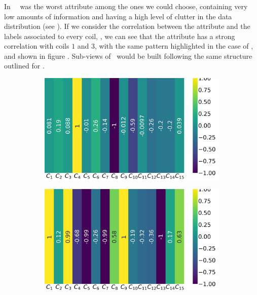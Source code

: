\subsubsection{\bn}
In \qrp\ \bn\ was the worst attribute among the ones we could choose, containing very low amounts of information and
having a high level of clutter in the data distribution (see ). If we consider the
correlation between the attribute and the labels associated to every coil, ,
we can see that the attribute has a strong correlation with coils $1$ and $3$, with the same pattern
highlighted in the case of \an, and shown in figure . Sub-views of \bn\ would be built following the same structure outlined for \an.

\begin{figure}[!h]
	\centering
	\begin{subfigure}{0.49\linewidth}
		\includegraphics[width=\linewidth]{img/qlp_corr/Bn_coil0.png}
	\end{subfigure}
	\begin{subfigure}{0.49\linewidth}
		\includegraphics[width=\linewidth]{img/qlp_corr/Bn_coil1.png}

\end{subfigure}
\end{figure}
